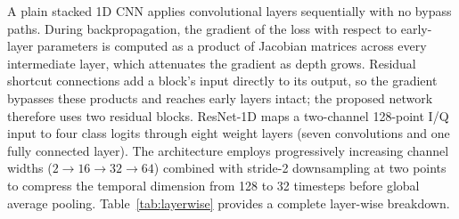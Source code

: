 \documentclass[conference]{IEEEtran}
\begin{document}
A plain stacked 1D CNN applies convolutional layers sequentially with no bypass paths. During backpropagation, the gradient of the loss with respect to early-layer parameters is computed as a product of Jacobian matrices across every intermediate layer, which attenuates the gradient as depth grows. Residual shortcut connections add a block's input directly to its output, so the gradient bypasses these products and reaches early layers intact; the proposed network therefore uses two residual blocks.
ResNet-1D maps a two-channel 128-point I/Q input to four class logits through eight weight layers (seven convolutions and one fully connected layer). The architecture employs progressively increasing channel widths ($2 \rightarrow 16 \rightarrow 32 \rightarrow 64$) combined with stride-2 downsampling at two points to compress the temporal dimension from 128 to 32 timesteps before global average pooling. Table~\ref{tab:layerwise} provides a complete layer-wise breakdown.
\end{document}

